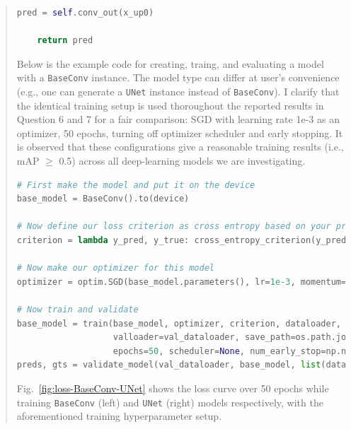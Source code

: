 \documentclass[11pt]{article}
\begin{document}
\begin{quote}
\begin{lstlisting}[language=Python, basicstyle=\scriptsize]
    pred = self.conv_out(x_up0)

    return pred
\end{lstlisting}


Below is the example code for creating, traing, and evaluating a model with a \texttt{BaseConv} instance. The model type can differ at user's convenience (e.g., one can generate a \texttt{UNet} instance instead of \texttt{BaseConv}). I clarify that the identical training setup is used thoroughout the reported results in Question 6 and 7 for a fair comparison: SGD with learning rate 1e-3 as an optimizer, 50 epochs, turning off optimizer scheduler and early stopping. It is observed that these configurations give a reasonable training results (i.e., mAP $\geq$ 0.5) across all deep-learning models we are investigating. 

\begin{lstlisting}[language=Python, basicstyle=\scriptsize]
# First make the model and put it on the device
base_model = BaseConv().to(device)

# Now define our loss criterion as cross entropy based on your previous code
criterion = lambda y_pred, y_true: cross_entropy_criterion(y_pred, y_true, class_weights, device)

# Now make our optimizer for this model
optimizer = optim.SGD(base_model.parameters(), lr=1e-3, momentum=0.9, weight_decay=0.01)

# Now train and validate
base_model = train(base_model, optimizer, criterion, dataloader, device, 
                   valloader=val_dataloader, save_path=os.path.join(MODEL_PATH, str(base_model)),
                   epochs=50, scheduler=None, num_early_stop=np.nan)
preds, gts = validate_model(val_dataloader, base_model, list(dataset.classes), device)
\end{lstlisting}

Fig.~\ref{fig:loss-BaseConv-UNet} shows the loss curve over 50 epochs while training \texttt{BaseConv} (left) and \texttt{UNet} (right) models respectively, with the aforementioned training hyperparameter setup. 


\end{quote}
\end{document}
